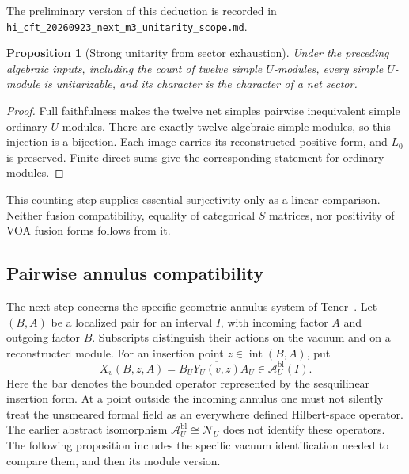 \documentclass[11pt,a4paper]{article}
\newtheorem{proposition}[theorem]{Proposition}
\theoremstyle{definition}
\newcommand{\artifact}[1]{\textnormal{\nolinkurl{#1}}}
\begin{document}
The preliminary version of this deduction is recorded in
\artifact{hi_cft_20260923_next_m3_unitarity_scope.md}.

\begin{proposition}[Strong unitarity from sector exhaustion]
\label{prop:analytic-strong-unitarity}
Under the preceding algebraic inputs, including the count of twelve
simple $U$-modules, every simple $U$-module is
unitarizable, and its character is the character of a net sector.
\end{proposition}
\begin{proof}
Full faithfulness makes the twelve net simples pairwise inequivalent
simple ordinary $U$-modules.  There are exactly twelve algebraic simple
modules, so this injection is a bijection.  Each image carries its
reconstructed positive form, and $L_0$ is preserved.  Finite direct sums
give the corresponding statement for ordinary modules.
\end{proof}

This counting step supplies essential surjectivity only as a linear
comparison.  Neither fusion compatibility, equality of categorical
$S$ matrices, nor positivity of VOA fusion forms follows from it.

\subsection{Pairwise annulus compatibility}
\label{subsec:analytic-annuli}

The next step concerns the specific geometric annulus system of
Tener~\cite[Definition~3.18 and Corollaries~3.20--3.22]{TenFields}.
Let $(B,A)$ be a localized pair for an interval $I$, with incoming
factor $A$ and outgoing factor $B$.  Subscripts distinguish their
actions on the vacuum and on a reconstructed module.  For an insertion
point $z\in\operatorname{int}(B,A)$, put
\[
 X_v(B,z,A)=\overline{B_UY_U(v,z)A_U}
       \in\mathcal A_U^{\mathrm{bl}}(I).
\]
Here the bar denotes the bounded operator represented by the
sesquilinear insertion form.  At a point outside the incoming annulus
one must not silently treat the unsmeared formal field as an everywhere
defined Hilbert-space operator.  The earlier abstract isomorphism
$\mathcal A_U^{\mathrm{bl}}\cong\mathcal N_U$ does not identify these
operators.  The following proposition includes the specific vacuum
identification needed to compare them, and then its module version.
\end{document}
